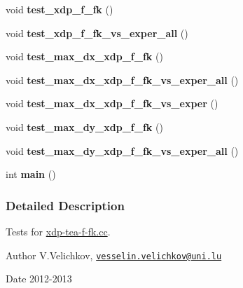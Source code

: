\begin{DoxyCompactItemize}
\item 
\hypertarget{xdp-tea-f-fk-tests_8cc_a7a37a0309e2b3124cfc9b6663a74269a}{void {\bfseries test\-\_\-xdp\-\_\-f\-\_\-fk} ()}\label{xdp-tea-f-fk-tests_8cc_a7a37a0309e2b3124cfc9b6663a74269a}

\item 
\hypertarget{xdp-tea-f-fk-tests_8cc_a1b064e86e0e9b3a7203efc3b638f4c25}{void {\bfseries test\-\_\-xdp\-\_\-f\-\_\-fk\-\_\-vs\-\_\-exper\-\_\-all} ()}\label{xdp-tea-f-fk-tests_8cc_a1b064e86e0e9b3a7203efc3b638f4c25}

\item 
\hypertarget{xdp-tea-f-fk-tests_8cc_aff7575a84c4518280c8f4874d89fc8f8}{void {\bfseries test\-\_\-max\-\_\-dx\-\_\-xdp\-\_\-f\-\_\-fk} ()}\label{xdp-tea-f-fk-tests_8cc_aff7575a84c4518280c8f4874d89fc8f8}

\item 
\hypertarget{xdp-tea-f-fk-tests_8cc_aa20698849dfe256454d4b3a5de98729d}{void {\bfseries test\-\_\-max\-\_\-dx\-\_\-xdp\-\_\-f\-\_\-fk\-\_\-vs\-\_\-exper\-\_\-all} ()}\label{xdp-tea-f-fk-tests_8cc_aa20698849dfe256454d4b3a5de98729d}

\item 
\hypertarget{xdp-tea-f-fk-tests_8cc_a8ae08d4a141b9ad5d5a065682f127029}{void {\bfseries test\-\_\-max\-\_\-dx\-\_\-xdp\-\_\-f\-\_\-fk\-\_\-vs\-\_\-exper} ()}\label{xdp-tea-f-fk-tests_8cc_a8ae08d4a141b9ad5d5a065682f127029}

\item 
\hypertarget{xdp-tea-f-fk-tests_8cc_a0e25eab7175732a24a7a767e7371f6d6}{void {\bfseries test\-\_\-max\-\_\-dy\-\_\-xdp\-\_\-f\-\_\-fk} ()}\label{xdp-tea-f-fk-tests_8cc_a0e25eab7175732a24a7a767e7371f6d6}

\item 
\hypertarget{xdp-tea-f-fk-tests_8cc_acff6607f9ac3dc217f346f465e391506}{void {\bfseries test\-\_\-max\-\_\-dy\-\_\-xdp\-\_\-f\-\_\-fk\-\_\-vs\-\_\-exper\-\_\-all} ()}\label{xdp-tea-f-fk-tests_8cc_acff6607f9ac3dc217f346f465e391506}

\item 
\hypertarget{xdp-tea-f-fk-tests_8cc_ae66f6b31b5ad750f1fe042a706a4e3d4}{int {\bfseries main} ()}\label{xdp-tea-f-fk-tests_8cc_ae66f6b31b5ad750f1fe042a706a4e3d4}

\end{DoxyCompactItemize}


\subsubsection{\-Detailed \-Description}
\-Tests for \hyperlink{xdp-tea-f-fk_8cc}{xdp-\/tea-\/f-\/fk.\-cc}. \begin{DoxyAuthor}{\-Author}
\-V.\-Velichkov, \href{mailto:vesselin.velichkov@uni.lu}{\tt vesselin.\-velichkov@uni.\-lu} 
\end{DoxyAuthor}
\begin{DoxyDate}{\-Date}
2012-\/2013 
\end{DoxyDate}

